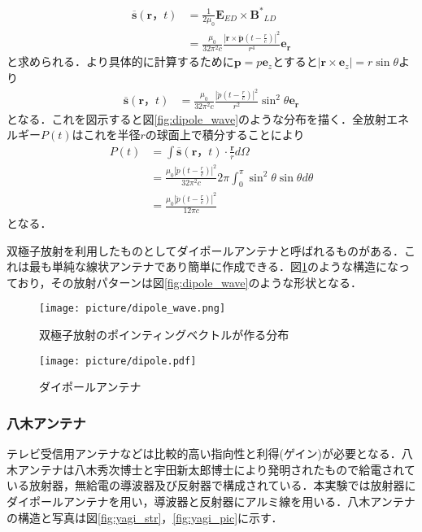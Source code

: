 \documentclass[a4j,10pt,oneside,openany]{jsbook}
\newcommand{\vE}{\boldsymbol{E}}
\newcommand{\vB}{\boldsymbol{B}}
\newcommand{\vs}{\boldsymbol{s}}
\newcommand{\ve}{\boldsymbol{e}}
\newcommand{\vr}{\boldsymbol{r}}
\newcommand{\vp}{\boldsymbol{p}}
\begin{document}
{\begin{align}
  \overline{\vs}(\vr，t)&=\frac{1}{2\mu_0}\vE_{ED}\times{{\vB}^*}_{LD}\nonumber\\
  &=\frac{\mu_0}{32\pi^2 c}\frac{|\vr\times\ddot{\vp}(t-\frac{r}{c})|^2}{r^4}\ve_{\vr}
\end{align}
と求められる．より具体的に計算するために$\vp=p\ve_z$とすると$|\vr\times\ve_z|=r\sin\theta$より
\begin{align}
  \overline{\vs}(\vr，t)&=\frac{\mu_0}{32\pi^2 c}\frac{|\ddot{p}(t-\frac{r}{c})|^2}{r^2} \sin^2\theta\ve_{\vr}
\end{align}
となる．これを図示すると図\ref{fig:dipole_wave}のような分布を描く．全放射エネルギー$P(t)$はこれを半径$r$の球面上で積分することにより
\begin{align}
  P(t)&=\int \overline{\vs}(\vr，t) \cdot \frac{\vr}{r} d \Omega\nonumber\\
  &=\frac{\mu_0|\ddot{p}(t-\frac{r}{c})|^2}{32\pi^2c} 2\pi \int_{0}^{\pi} \sin^2\theta \sin\theta d\theta\nonumber\\
  &=\frac{\mu_0|\ddot{p}(t-\frac{r}{c})|^2}{12\pi c}
\end{align}
となる．

双極子放射を利用したものとしてダイポールアンテナと呼ばれるものがある．これは最も単純な線状アンテナであり簡単に作成できる．図\ref{fig:dipole}のような構造になっており，その放射パターンは図\ref{fig:dipole_wave}のような形状となる．

\begin{figure}[htbp]
  \begin{minipage}{0.5\hsize}
    \begin{center}
      \texttt{[image: picture/dipole\_wave.png]}
    \end{center}
    \caption{双極子放射のポインティングベクトルが作る分布}
    \label{fig:dipole_wave}
  \end{minipage}
  \begin{minipage}{0.5\hsize}
    \begin{center}
      \texttt{[image: picture/dipole.pdf]}
    \end{center}
    \caption{ダイポールアンテナ}
    \label{fig:dipole}
  \end{minipage}
\end{figure}

\subsubsection{八木アンテナ}
テレビ受信用アンテナなどは比較的高い指向性と利得(ゲイン)が必要となる．八木アンテナは八木秀次博士と宇田新太郎博士により発明されたもので給電されている放射器，無給電の導波器及び反射器で構成されている．本実験では放射器にダイポールアンテナを用い，導波器と反射器にアルミ線を用いる．八木アンテナの構造と写真は図\ref{fig:yagi_str}，\ref{fig:yagi_pic}に示す．

}
\end{document}
